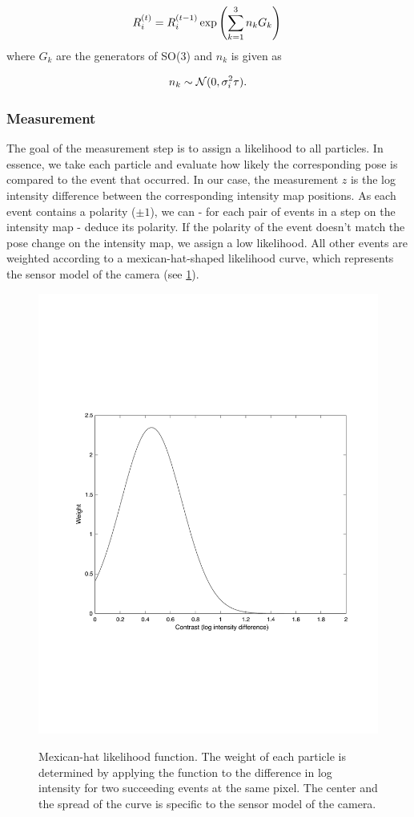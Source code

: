 \documentclass[10pt,twocolumn,letterpaper]{article}
\begin{document}
\begin{equation}
      R^{(t)}_i = R^{(t-1)}_i \exp \left(
    \sum_{k=1}^3n_k G_k
    \right) \\
\end{equation}
where $G_k$ are the generators of SO(3) and $n_k$ is given as 

\begin{equation}
    n_k \sim \mathcal N (0, \sigma_i^2\tau).\\
\end{equation}


\subsubsection*{Measurement}
The goal of the measurement step is to assign a likelihood to all particles. In essence, we take each particle and evaluate how likely the corresponding pose is compared to the event that occurred. 
In our case, the measurement $z$ is the log intensity difference between the corresponding intensity map positions. 
As each event contains a polarity ($\pm 1$), we can - for each pair of events in a step on the intensity map - deduce its polarity. If the polarity of the event doesn't match the pose change on the intensity map, we assign a low likelihood. All other events are weighted according to a mexican-hat-shaped likelihood curve, which represents the sensor model of the camera (see \cref{fig:mexican}). 

\begin{figure}[h!]
   \centering
    \includegraphics[width=0.6\linewidth]{figures/mexican.pdf}
    \label{fig:mexican}
    \caption{Mexican-hat likelihood function. The weight of each particle is determined by applying the function to the difference in log intensity for two succeeding events at the same pixel. The center and the spread of the curve is specific to the sensor model of the camera.\cite{kim2014simultaneous}}
\end{figure}
\end{document}
